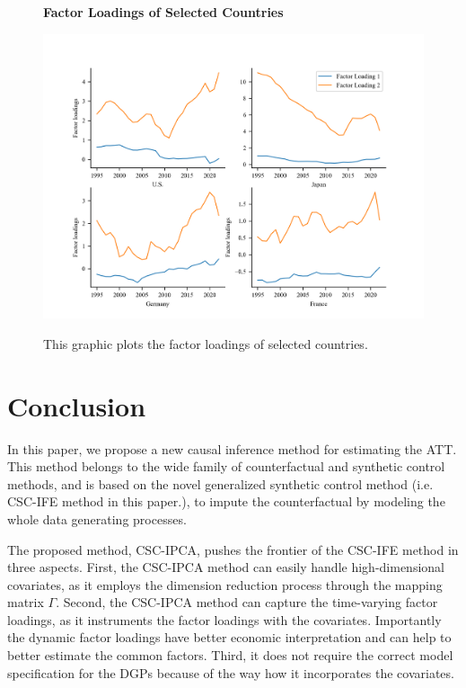 \documentclass[12pt]{article}
\begin{document}
    \begin{figure}[!ht]
        \centering
        \caption{\textbf{Factor Loadings of Selected Countries}} 
        \includegraphics{figs/loadings_ipca.png}
        \label{fig: loadings}
        \caption*{\footnotesize{This graphic plots the factor loadings of selected countries.}}
    \end{figure}
    
\section{Conclusion} 
\label{sec: conclusion}

In this paper, we propose a new causal inference method for estimating the ATT. This method belongs to the wide family of counterfactual and synthetic control methods, and is based on the novel generalized synthetic control method (i.e. CSC-IFE method in this paper.), to impute the counterfactual by modeling the whole data generating processes.

The proposed method, CSC-IPCA, pushes the frontier of the CSC-IFE method in three aspects. First, the CSC-IPCA method can easily handle high-dimensional covariates, as it employs the dimension reduction process through the mapping matrix $\Gamma$. Second, the CSC-IPCA method can capture the time-varying factor loadings, as it instruments the factor loadings with the covariates. Importantly the dynamic factor loadings have better economic interpretation and can help to better estimate the common factors. Third, it does not require the correct model specification for the DGPs because of the way how it incorporates the covariates.
\end{document}
